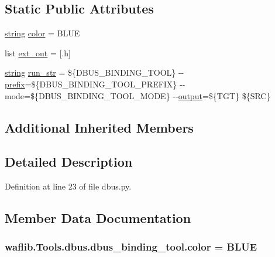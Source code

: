 \subsection*{Static Public Attributes}
\begin{DoxyCompactItemize}
\item 
\hyperlink{test__lib_f_l_a_c_2format_8c_ab02026ad0de9fb6c1b4233deb0a00c75}{string} \hyperlink{classwaflib_1_1_tools_1_1dbus_1_1dbus__binding__tool_a7ac79bc5132610a521fce53ba065f33b}{color} = \textquotesingle{}B\+L\+UE\textquotesingle{}
\item 
list \hyperlink{classwaflib_1_1_tools_1_1dbus_1_1dbus__binding__tool_a7bf8e16b08b9a8528e108e0ff3deb8e7}{ext\+\_\+out} = \mbox{[}\textquotesingle{}.h\textquotesingle{}\mbox{]}
\item 
\hyperlink{test__lib_f_l_a_c_2format_8c_ab02026ad0de9fb6c1b4233deb0a00c75}{string} \hyperlink{classwaflib_1_1_tools_1_1dbus_1_1dbus__binding__tool_aa0eaad96b0eeb12a4486269aed1e7aae}{run\+\_\+str} = \textquotesingle{}\$\{D\+B\+U\+S\+\_\+\+B\+I\+N\+D\+I\+N\+G\+\_\+\+T\+O\+OL\} -\/-\/\hyperlink{structprefix}{prefix}=\$\{D\+B\+U\+S\+\_\+\+B\+I\+N\+D\+I\+N\+G\+\_\+\+T\+O\+O\+L\+\_\+\+P\+R\+E\+F\+IX\} -\/-\/mode=\$\{D\+B\+U\+S\+\_\+\+B\+I\+N\+D\+I\+N\+G\+\_\+\+T\+O\+O\+L\+\_\+\+M\+O\+DE\} -\/-\/\hyperlink{mm_8c_aeb3fcf4ab0f02cc4420e5a97568a07ef}{output}=\$\{T\+GT\} \$\{S\+RC\}\textquotesingle{}
\end{DoxyCompactItemize}
\subsection*{Additional Inherited Members}


\subsection{Detailed Description}


Definition at line 23 of file dbus.\+py.



\subsection{Member Data Documentation}
\subsubsection[{\texorpdfstring{color}{color}}]{ waflib.\+Tools.\+dbus.\+dbus\+\_\+binding\+\_\+tool.\+color = \textquotesingle{}B\+L\+UE\textquotesingle{}\hspace{0.3cm}{\ttfamily [static]}}\hypertarget{classwaflib_1_1_tools_1_1dbus_1_1dbus__binding__tool_a7ac79bc5132610a521fce53ba065f33b}{}\label{classwaflib_1_1_tools_1_1dbus_1_1dbus__binding__tool_a7ac79bc5132610a521fce53ba065f33b}


